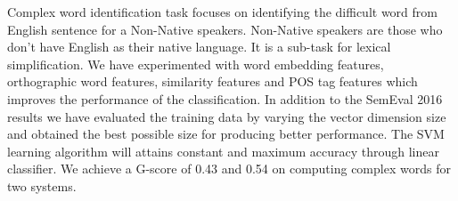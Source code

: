 Complex word identification task focuses on identifying the difficult word from English sentence for a Non-Native speakers. Non-Native speakers are those who don't have English as their native language. It is a sub-task for lexical simplification. We have experimented with word embedding features, orthographic word features, similarity features and POS tag features which improves the performance of the classification. In addition to the SemEval 2016 results we have evaluated the training data by varying the vector dimension size and obtained the best possible size for producing better performance. The SVM learning algorithm will attains constant and maximum accuracy through linear classifier. We achieve a G-score of 0.43 and 0.54 on computing complex words for two systems.
